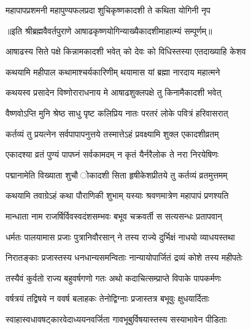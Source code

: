 \twolineshloka
{महापापप्रशमनी महापुण्यफलप्रदा}
{शुचिकृष्णकादशी ते कथिता योगिनी नृप} %

॥इति श्रीब्रह्मवैवर्तपुराणे आषाढकृष्णयोगिन्याख्यैकादशीमाहात्म्यं सम्पूर्णम्॥


\hyperref[sec:ekadashi_mahatmyam_vrata_raja]{\closesub}
\clearpage

\label{sec:vrata-raja-ashadha-shukla-shayani}


\twolineshloka
{आषाढस्य सिते पक्षे किन्नामकादशी भवेत्}
{को देवः को विधिस्तस्या एतदाख्याहि केशव} %


\twolineshloka
{कथयामि महीपाल कथामाश्चर्यकारिणीम्}
{थयामास यां ब्रह्मा नारदाय महात्मने} %


\twolineshloka
{कथयस्व प्रसादेन विष्णोराराधनाय मे}
{आषाढशुक्लपक्षे तु किनामैकादशी भवेत्} %


\twolineshloka
{वैष्णवोऽप्ति मुनि श्रेष्ठ साधु पृष्ट कलिप्रिय}
{नातः परतरं लोके पवित्रं हरिवासरात्} %

\twolineshloka
{कर्तव्यं तु प्रयत्नेन सर्वपापापनुत्तये}
{तस्मात्तेऽहं प्रवक्ष्यामि शुक्ल एकादशीव्रतम्} %

\twolineshloka
{एकादश्या व्रतं पुण्यं पापघ्नं सर्वकामदम्}
{न कृतं यैर्नरैलोक ते नरा निरयेषिणः} %

\twolineshloka
{पद्मानामेति विख्याता शुचौ ोकादशी सिता}
{हृषीकेशप्रीतये तु कर्तव्यं व्रतमुत्तमम्} %

\twolineshloka
{कथयामि तवाग्रेऽहं कथा पौराणिकी शुभाम्}
{यस्याः श्रवणमात्रेण महापापं प्रणश्यति} %

\twolineshloka
{मान्धाता नाम राजर्षिर्विवस्वदंशसम्भवः}
{बभूव चक्रवर्ती स सत्यसन्धः प्रतापवान्} %

\twolineshloka
{धर्मतः पालयामास प्रजाः पुत्रानिवौरसान्}
{ने तस्य राज्ये दुर्भिक्षं नाधयो व्याधयस्तथा} %

\twolineshloka
{निरातङ्काः प्रजास्तस्य धनधान्यसमन्विताः}
{नान्यायोपार्जितं द्रव्यं कोशे तस्य महीपतेः} %

\twolineshloka
{तस्यैवं कुर्वतो राज्य बहुवर्षगणो गतः}
{अथो कदाचित्सम्प्राप्ते विपाके पापकर्मणः} %

\twolineshloka
{वर्षत्रयं तद्विषये न ववर्ष बलाहकः}
{तेनोद्विग्नाः प्रजास्तत्र बभूवुः क्षुधयार्दिताः} %

\twolineshloka
{स्वाहास्वधावषट्कारवेदाध्ययनवर्जिता}
{गावभूबुर्विषयास्तस्य सस्याभावेन पीडिताः} %

